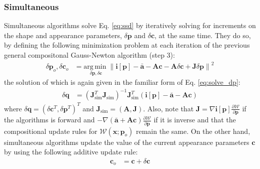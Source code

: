 \subsubsection{Simultaneous}
\label{sec:simultaneous}

Simultaneous algorithms solve Eq. \ref{eq:ssd} by iteratively solving for increments on the shape and appearance parameters, $\delta\mathbf{p}$ and $\delta\mathbf{c}$, at the same time. They do so, by defining the following minimization problem at each iteration of the previous general compositonal Gauss-Newton algorithm (step 3):
\begin{equation}
    \begin{aligned}
        \delta\mathbf{p}_o, \delta\mathbf{c}_o & = \underset{\delta\mathbf{p}, \delta\mathbf{c}}{\mathrm{arg\,min\;}} \left\| \mathbf{i}[\mathbf{p}] - \bar{\mathbf{a}} - \mathbf{A} \mathbf{c} -  \mathbf{A} \delta\mathbf{c}  + \mathbf{J} \delta\mathbf{p} \right\|^2 
    \label{eq:sim_cost}
    \end{aligned}
\end{equation}
the solution of which is again given in the familiar form of Eq. \ref{eq:solve_dp}:
\begin{equation}
    \begin{aligned}
        \delta\mathbf{q} & =  \left( \mathbf{J}_\text{sim}^T\mathbf{J}_\text{sim} \right)^{-1} \mathbf{J}_\text{sim}^T \left( \mathbf{i}[\mathbf{p}] - \bar{\mathbf{a}} - \mathbf{A}\mathbf{c} \right)
    \label{eq:sim_solution}
    \end{aligned}
\end{equation}
where $\delta\mathbf{q} = \left( \delta\mathbf{c}^T, \delta\mathbf{p}^T \right)^T$ and $\mathbf{J}_\text{sim} = \left( \mathbf{A}, \mathbf{J} \right)$. Also, note that $\mathbf{J} = \nabla\mathbf{i}[\mathbf{p}] \frac{\partial\mathcal{W}}{\partial\mathbf{p}}$ if the algorithms is forward and $-\nabla\left(\bar{\mathbf{a}} + \mathbf{A}\mathbf{c} \right) \frac{\partial\mathcal{W}}{\partial\mathbf{p}}$ if it is inverse and that the compositional update rules for $\mathcal{W}(\mathbf{x}; \mathbf{p}_o)$ remain the same. On the other hand, simultaneous algorithms update the value of the current appearance parameters $\mathbf{c}$ by using the following additive update rule:
\begin{equation}
    \begin{aligned}
        \mathbf{c}_o & =  \mathbf{c} + \delta\mathbf{c} 
    \label{eq:appearance_update}
    \end{aligned}
\end{equation}

